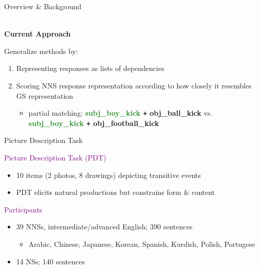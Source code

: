 \documentclass[final,t]{beamer}
\begin{document}
\begin{frame}{}
\begin{columns}[t]
\begin{column}{.33\linewidth}
\begin{block}{Overview \& Background}
  \begin{center}
    \mbox{}\\\textbf{Current Approach} 
  \end{center}
    Generalize methods by:\\[0.5em]
    \begin{minipage}{.9\textwidth}
    \begin{enumerate}
    \item Representing responses as lists of dependencies
    \item Scoring NNS response representation according to how closely it resembles GS representation
  	\begin{itemize}
		\item{partial matching: \textbf{\textcolor{forestgreen}{subj\_boy\_kick} \texttt{+} \textcolor{carnelian}{obj\_ball\_kick}} vs. \textbf{\textcolor{forestgreen}{subj\_boy\_kick} \texttt{+} \textcolor{carnelian}{obj\_football\_kick}}}

	\end{itemize}
    \end{enumerate}
  \end{minipage}
\end{block}

\begin{block}{Picture Description Task}
\begin{center}
  \textcolor{purple}{Picture Description Task (PDT)}
\end{center}
	\vspace{-.38em}
    \begin{itemize}
    \item{10 items (2 photos, 8 drawings) depicting transitive events}
    \item{PDT elicits natural productions but constrains form \& content}
    \end{itemize}
\begin{center}
  \textcolor{purple}{Participants}
\end{center}
	\vspace{-.38em}
    \begin{itemize}
    \item{39 NNSs, intermediate/advanced English; 390 sentences}
      \begin{itemize}
      \item{Arabic, Chinese, Japanese, Korean, Spanish, Kurdish, Polish, Portugese}
      \end{itemize}
      \smallskip
    \item{14 NSs; 140 sentences}
    \end{itemize}
	\bigskip
\setlength{\fboxsep}{3pt}
\setlength{\fboxrule}{0pt}
	

\end{block}
\end{column}
\end{columns}
\end{frame}
\end{document}
